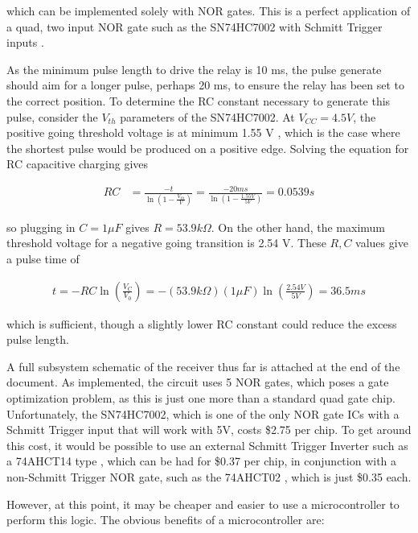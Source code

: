 \documentclass{article}
\begin{document}
		which can be implemented solely with NOR gates.  This is a perfect application of a quad, two input NOR gate such as the SN74HC7002 with Schmitt Trigger inputs \cite{SN74HC7002datasheet}.

		As the minimum pulse length to drive the relay is 10 ms, the pulse generate should aim for a longer pulse, perhaps 20 ms, to ensure the relay has been set to the correct position.  To determine the RC constant necessary to generate this pulse, consider the $V_{th}$ parameters of the SN74HC7002.  At $V_{CC} = 4.5V$, the positive going threshold voltage is at minimum 1.55 V \cite{SN74HC7002datasheet}, which is the case where the shortest pulse would be produced on a positive edge.  Solving the equation for RC capacitive charging gives

		\begin{align}
			RC &= \frac{-t}{\ln\left( 1 - \frac{V_{th}}{V} \right)} = \frac{-20ms}{\ln\left( 1 - \frac{1.55V}{5V} \right)} = 0.0539 s
		\end{align}

		so plugging in $C = 1 \mu F$ gives $R = 53.9 k\Omega$.  On the other hand, the maximum threshold voltage for a negative going transition is 2.54 V.  These $R, C$ values give a pulse time of 

		\begin{align}
			t  = - RC\ln\left( \frac{V_C}{V_0} \right) = -(53.9 k\Omega)(1 \mu F) \ln\left(\frac{2.54V}{5V} \right) = 36.5 ms
		\end{align}

		which is sufficient, though a slightly lower RC constant could reduce the excess pulse length.

		A full subsystem schematic of the receiver thus far is attached at the end of the document.  As implemented, the circuit uses 5 NOR gates, which poses a gate optimization problem, as this is just one more than a standard quad gate chip.  Unfortunately, the SN74HC7002, which is one of the only NOR gate ICs with a Schmitt Trigger input that will work with 5V, costs \$2.75 per chip.  To get around this cost, it would be possible to use an external Schmitt Trigger Inverter such as a 74AHCT14 type \cite{74HCT14datasheet}, which can be had for \$0.37 per chip, in conjunction with a non-Schmitt Trigger NOR gate, such as the 74AHCT02 \cite{74AHCT02datasheet}, which is just \$0.35 each.

		However, at this point, it may be cheaper and easier to use a microcontroller to perform this logic.  The obvious benefits of a microcontroller are:
		
\end{document}
